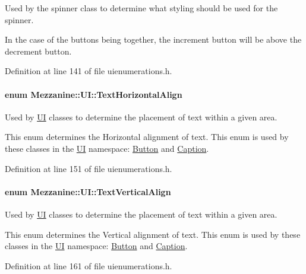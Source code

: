 Used by the spinner class to determine what styling should be used for the spinner. 

In the case of the buttons being together, the increment button will be above the decrement button. 

Definition at line 141 of file uienumerations.h.

\hypertarget{namespaceMezzanine_1_1UI_aebbd46e62bb20d958f1915c1ec6cc549}{
\paragraph[{TextHorizontalAlign}]{\setlength{\rightskip}{0pt plus 5cm}enum {\bf Mezzanine::UI::TextHorizontalAlign}}\hfill}
\label{namespaceMezzanine_1_1UI_aebbd46e62bb20d958f1915c1ec6cc549}


Used by \hyperlink{namespaceMezzanine_1_1UI}{UI} classes to determine the placement of text within a given area. 

This enum determines the Horizontal alignment of text. This enum is used by these classes in the \hyperlink{namespaceMezzanine_1_1UI}{UI} namespace: \hyperlink{classMezzanine_1_1UI_1_1Button}{Button} and \hyperlink{classMezzanine_1_1UI_1_1Caption}{Caption}. 

Definition at line 151 of file uienumerations.h.

\hypertarget{namespaceMezzanine_1_1UI_ab35e3845e2541698245262cc17147ae9}{
\paragraph[{TextVerticalAlign}]{\setlength{\rightskip}{0pt plus 5cm}enum {\bf Mezzanine::UI::TextVerticalAlign}}\hfill}
\label{namespaceMezzanine_1_1UI_ab35e3845e2541698245262cc17147ae9}


Used by \hyperlink{namespaceMezzanine_1_1UI}{UI} classes to determine the placement of text within a given area. 

This enum determines the Vertical alignment of text. This enum is used by these classes in the \hyperlink{namespaceMezzanine_1_1UI}{UI} namespace: \hyperlink{classMezzanine_1_1UI_1_1Button}{Button} and \hyperlink{classMezzanine_1_1UI_1_1Caption}{Caption}. 

Definition at line 161 of file uienumerations.h.

